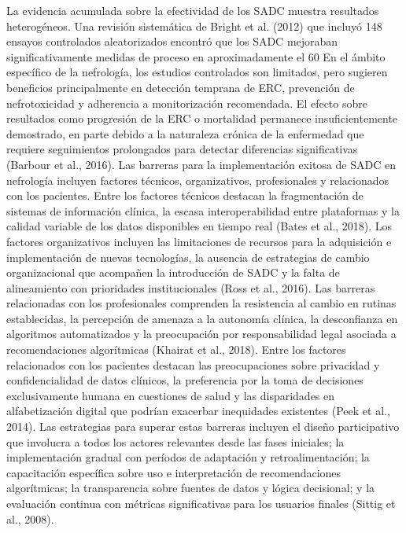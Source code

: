 \documentclass{article}
\begin{document}
\begin{multicols}{2}
La evidencia acumulada sobre la efectividad de los SADC muestra resultados heterogéneos. Una revisión sistemática de Bright et al. (2012) que incluyó 148 ensayos controlados aleatorizados encontró que los SADC mejoraban significativamente medidas de proceso en aproximadamente el 60%
En el ámbito específico de la nefrología, los estudios controlados son limitados, pero sugieren beneficios principalmente en detección temprana de ERC, prevención de nefrotoxicidad y adherencia a monitorización recomendada. El efecto sobre resultados como progresión de la ERC o mortalidad permanece insuficientemente demostrado, en parte debido a la naturaleza crónica de la enfermedad que requiere seguimientos prolongados para detectar diferencias significativas (Barbour et al., 2016).
Las barreras para la implementación exitosa de SADC en nefrología incluyen factores técnicos, organizativos, profesionales y relacionados con los pacientes. Entre los factores técnicos destacan la fragmentación de sistemas de información clínica, la escasa interoperabilidad entre plataformas y la calidad variable de los datos disponibles en tiempo real (Bates et al., 2018).
Los factores organizativos incluyen las limitaciones de recursos para la adquisición e implementación de nuevas tecnologías, la ausencia de estrategias de cambio organizacional que acompañen la introducción de SADC y la falta de alineamiento con prioridades institucionales (Ross et al., 2016).
Las barreras relacionadas con los profesionales comprenden la resistencia al cambio en rutinas establecidas, la percepción de amenaza a la autonomía clínica, la desconfianza en algoritmos automatizados y la preocupación por responsabilidad legal asociada a recomendaciones algorítmicas (Khairat et al., 2018).
Entre los factores relacionados con los pacientes destacan las preocupaciones sobre privacidad y confidencialidad de datos clínicos, la preferencia por la toma de decisiones exclusivamente humana en cuestiones de salud y las disparidades en alfabetización digital que podrían exacerbar inequidades existentes (Peek et al., 2014).
Las estrategias para superar estas barreras incluyen el diseño participativo que involucra a todos los actores relevantes desde las fases iniciales; la implementación gradual con períodos de adaptación y retroalimentación; la capacitación específica sobre uso e interpretación de recomendaciones algorítmicas; la transparencia sobre fuentes de datos y lógica decisional; y la evaluación continua con métricas significativas para los usuarios finales (Sittig et al., 2008).

\end{multicols}
\end{document}
